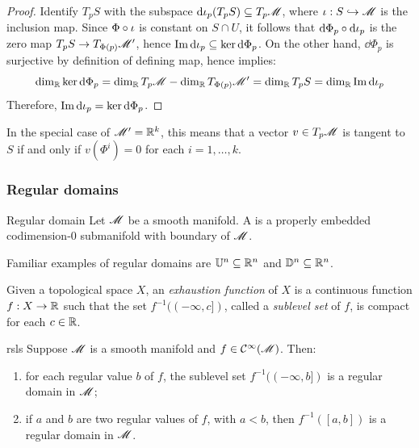 \begin{proofbox}
  \begin{proof}
    Identify $ T_pS $ with the subspace $ \mathrm{d} \iota_p(T_pS) \subseteq T_p\mathscr{M} $, where $ \iota : S \hookrightarrow \mathscr{M} $ is the inclusion map. Since $ \Phi \circ \iota $ is constant on $ S \cap U $, it follows that $ \mathrm{d} \Phi_p \circ \mathrm{d} \iota_p $ is the zero map $ T_pS \rightarrow T_{\Phi(p)}\mathscr{M}' $, hence $ \operatorname{Im} \mathrm{d} \iota_p \subseteq \ker \mathrm{d} \Phi_p $. On the other hand, $ \dd \Phi_p $ is surjective by definition of defining map, hence  implies:
    \begin{equation*}
      \dim_{\mathbb{R}} \ker \mathrm{d} \Phi_p = \dim_{\mathbb{R}} T_p\mathscr{M} - \dim_{\mathbb{R}} T_{\Phi(p)} \mathscr{M}' = \dim_{\mathbb{R}} T_pS = \dim_{\mathbb{R}} \operatorname{Im} \mathrm{d} \iota_p
    \end{equation*}
    Therefore, $ \operatorname{Im} \mathrm{d} \iota_p = \ker \mathrm{d} \Phi_p $.
  \end{proof}
\end{proofbox}

In the special case of $ \mathscr{M}' = \mathbb{R}^k $, this means that a vector $ v \in T_p\mathscr{M} $ is tangent to $ S $ if and only if $ v(\Phi^i) = 0 $ for each $ i = 1 , \dots , k $.

\subsubsection{Regular domains}

\begin{definition}{Regular domain}{}
  Let $ \mathscr{M} $ be a smooth manifold. A  is a properly embedded codimension-$ 0 $ submanifold with boundary of $ \mathscr{M} $.
\end{definition}

Familiar examples of regular domains are $ \mathbb{U}^n \subseteq \mathbb{R}^n $ and $ \mathbb{D}^{n} \subseteq \mathbb{R}^n $.

Given a topological space $ X $, an \emph{exhaustion function} of $ X $ is a continuous function $ f : X \rightarrow \mathbb{R} $ such that the set $ f^{-1}((-\infty,c]) $, called a \emph{sublevel set} of $ f $, is compact for each $ c \in \mathbb{R} $.

\begin{proposition}{}{rsls}
  Suppose $ \mathscr{M} $ is a smooth manifold and $ f \in \mathcal{C}^{\infty}(\mathscr{M}) $. Then:
  \begin{enumerate}
    \item \label{item:rsls-1} for each regular value $ b $ of $ f $, the sublevel set $ f^{-1}((-\infty,b]) $ is a regular domain in $ \mathscr{M} $;
    \item \label{item:rsls-2} if $ a $ and $ b $ are two regular values of $ f $, with $ a < b $, then $ f^{-1}([a,b]) $ is a regular domain in $ \mathscr{M} $.
  \end{enumerate}
\end{proposition}


